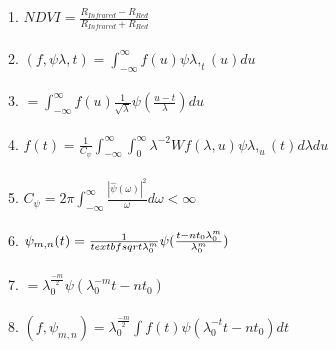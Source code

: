 \documentclass{article}
\begin{document}
1. \hspace {1cm} $NDVI= \frac{R_{Infrared}-R_{Red}}{R_{Infrared}+R_{Red}}$\\\\
2. \hspace{1cm} $(f,\psi\lambda,t)=\int_{-\infty}^{\infty}f(u)\psi\lambda,_{t}(u)du$\\\\
 3. \hspace{2.5cm} $=\int_{-\infty}^{\infty}f(u)\frac{1}{\sqrt{\lambda}}\psi(\frac{u-t}{\lambda})du$\\\\
 4.\hspace{1cm} $ f(t) = \frac{1}{C_{\psi}}\int_{-\infty}^{\infty}\int_{0}^{\infty}\lambda^{-2}Wf(\lambda,u)\psi\lambda,_{u}(t)d\lambda du$\\\\
 5. \hspace{1cm} $ C_{\psi} = 2\pi \int_{-\infty}^{\infty}\frac{|\widehat{\psi}(\omega)|^2}{\omega}d\omega <\infty$ \\\\
 6.  \hspace{1cm} $\psi_{m,n}(t) = \frac{1}{\\textbf{\textbf{\textbf{\textbf{\textbf{}}}}}sqrt{\lambda_{0}^m}}\psi(\frac{t-nt_{0}\lambda_{0}^m}{\lambda_{0}^m})$ \\\\
 7. \hspace{2.5cm} $=\lambda_{0}^{\frac{-m}{2}}\psi(\lambda_{0}^{-m}t-nt_{0})$ \\ \\ 
 8. \hspace{1cm}$(f,\psi_{m,n}) = \lambda_{0}^{\frac{-m}{2}}\int f(t)\psi(\lambda_{0}^{-t}t-nt_{0})dt $
 
 
\end{document}

